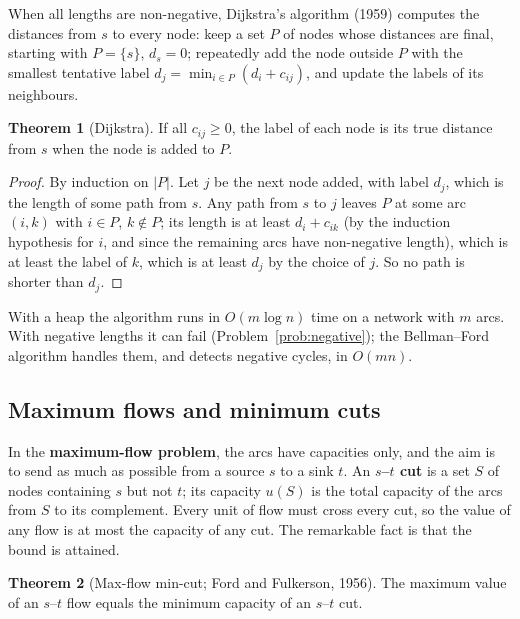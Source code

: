 \documentclass[11pt,a4paper]{article}
\numberwithin{equation}{section}
\theoremstyle{definition}
\newtheorem{thm}{Theorem}[subsection]
\begin{document}
When all lengths are non-negative, Dijkstra's algorithm (1959) computes the distances from $s$ to every node: keep a set $P$ of nodes whose distances are final, starting with $P = \{s\}$, $d_s = 0$; repeatedly add the node outside $P$ with the smallest tentative label $d_j = \min_{i \in P}(d_i + c_{ij})$, and update the labels of its
neighbours.

\begin{thm}[Dijkstra]
\label{thm:dijkstra}
If all $c_{ij} \geq 0$, the label of each node is its true distance from $s$ when the node is added to $P$.
\end{thm}

\begin{proof}
By induction on $|P|$. Let $j$ be the next node added, with label $d_j$, which is the length of some path from $s$. Any path from $s$ to $j$ leaves $P$ at some arc $(i, k)$ with $i \in P$, $k \notin P$; its length is at least $d_i + c_{ik}$ (by the induction hypothesis for $i$, and since the remaining arcs have
non-negative length), which is at least the label of $k$, which is at least $d_j$ by the choice of $j$. So no path is shorter than $d_j$.
\end{proof}

With a heap the algorithm runs in $O(m\log n)$ time on a network with $m$ arcs. With negative lengths it can fail (Problem~\ref{prob:negative}); the Bellman--Ford algorithm handles them, and detects negative cycles, in $O(mn)$.

\subsection{Maximum flows and minimum cuts}
\label{ssec:maxflow}

In the \textbf{maximum-flow problem}, the arcs have capacities only, and the aim is to send as much as possible from a source $s$ to a sink $t$. An \textbf{$s$--$t$ cut} is a set $S$ of nodes containing $s$ but not $t$; its capacity $u(S)$ is the total capacity of the arcs from $S$ to its complement. Every unit of flow
must cross every cut, so the value of any flow is at most the capacity of any cut. The remarkable fact is that the bound is attained.

\begin{thm}[Max-flow min-cut; Ford and Fulkerson, 1956]
\label{thm:maxflowmincut}
The maximum value of an $s$--$t$ flow equals the minimum capacity of an $s$--$t$ cut.
\end{thm}
\end{document}
